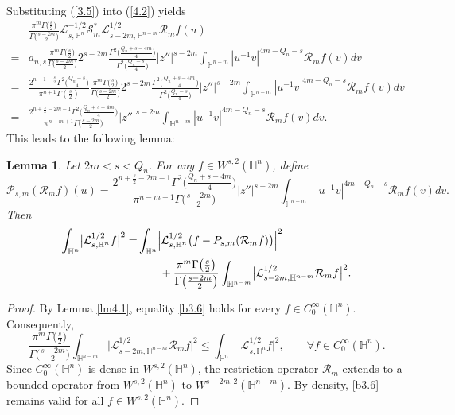 \documentclass[12pt,reqno]{amsart}%
\theoremstyle{plain}
\newtheorem{lemma}{Lemma}[section]
\numberwithin{equation}{section}
\begin{document}
Substituting (\ref{3.5}) into (\ref{4.2}) yields
\begin{align}\nonumber
&\frac{\pi^{m}\Gamma\bigl(\frac{s}{2}\bigr)}{\Gamma\bigl(\frac{s-2m}{2}\bigr)}
\mathcal{L}_{s,\mathbb{H}^{n}}^{-1/2}\mathcal{S}_{m}^{\ast}
\mathcal{L}_{s-2m,\mathbb{H}^{n-m}}^{1/2}\mathcal{R}_{m}f(u)\\
\nonumber
=& a_{n,s}\frac{\pi^{m}\Gamma\bigl(\frac{s}{2}\bigr)}{\Gamma\bigl(\frac{s-2m}{2}\bigr)}
2^{s-2m}\frac{\Gamma^{2}\bigl(\frac{Q_{n}+s-4m}{4}\bigr)}
{\Gamma^{2}\bigl(\frac{Q_{n}-s}{4}\bigr)}
|z''|^{s-2m}\int_{\mathbb{H}^{n-m}} |u^{-1}v|^{4m-Q_n-s}\mathcal{R}_{m}f(v)dv\\
\nonumber
=& \frac{2^{n-1-\frac{s}{2}}\Gamma^{2}\bigl(\frac{Q_n-s}{4}\bigr)}
{\pi^{n+1}\Gamma(\frac{s}{2})}
\frac{\pi^{m}\Gamma\bigl(\frac{s}{2}\bigr)}{\Gamma\bigl(\frac{s-2m}{2}\bigr)}
2^{s-2m}\frac{\Gamma^{2}\bigl(\frac{Q_{n}+s-4m}{4}\bigr)}
{\Gamma^{2}\bigl(\frac{Q_{n}-s}{4}\bigr)}
|z''|^{s-2m}
\int_{\mathbb{H}^{n-m}} |u^{-1}v|^{4m-Q_n-s}\mathcal{R}_{m}f(v)dv\\
=& \frac{2^{n+\frac{s}{2}-2m-1}\Gamma^{2}\bigl(\frac{Q_n+s-4m}{4}\bigr)}
{\pi^{n-m+1}\Gamma\bigl(\frac{s-2m}{2}\bigr)}
|z''|^{s-2m}
\int_{\mathbb{H}^{n-m}} |u^{-1}v|^{4m-Q_n-s}\mathcal{R}_{m}f(v)dv.
\label{c3.7}
\end{align}
This leads to the following lemma:
\begin{lemma}\label{lm4.2}
Let \(2m < s < Q_n\). For any \(f \in W^{s,2}(\mathbb{H}^{n})\), define
\[
\mathcal{P}_{s,m}(\mathcal{R}_{m}f)(u)=\frac{2^{n+\frac{s}{2}-2m-1}\Gamma^{2}\bigl(\frac{Q_n+s-4m}{4}\bigr)}
{\pi^{n-m+1}\Gamma\bigl(\frac{s-2m}{2}\bigr)}
|z''|^{s-2m}\int_{\mathbb{H}^{n-m}} |u^{-1}v|^{4m-Q_n-s}\mathcal{R}_{m}f(v)dv .
\]
Then
\begin{align}\nonumber
\int_{\mathbb{H}^{n}}\bigl|\mathcal{L}_{s,\mathbb{H}^{n}}^{1/2}f\bigr|^{2}
=& \int_{\mathbb{H}^{n}}\Bigl|\mathcal{L}_{s,\mathbb{H}^{n}}^{1/2}\bigl(f-
P_{s,m}(\mathcal{R}_{m}f)\bigr)\Bigr|^{2} \\
\label{b3.6}
&\qquad+ \frac{\pi^{m}\Gamma\bigl(\frac{s}{2}\bigr)}{\Gamma\bigl(\frac{s-2m}{2}\bigr)}
\int_{\mathbb{H}^{n-m}}\bigl|\mathcal{L}_{s-2m,\mathbb{H}^{n-m}}^{1/2}\mathcal{R}_{m}f\bigr|^{2}.
\end{align}


\end{lemma}
\begin{proof}
By Lemma \ref{lm4.1}, equality \eqref{b3.6} holds for every \(f \in C_{0}^{\infty}(\mathbb{H}^{n})\). Consequently,
\[
\frac{\pi^{m}\Gamma\bigl(\frac{s}{2}\bigr)}{\Gamma\bigl(\frac{s-2m}{2}\bigr)}
\int_{\mathbb{H}^{n-m}}\bigl|\mathcal{L}_{s-2m,\mathbb{H}^{n-m}}^{1/2}\mathcal{R}_{m}f\bigr|^{2}
\leq \int_{\mathbb{H}^{n}}\bigl|\mathcal{L}_{s,\mathbb{H}^{n}}^{1/2}f\bigr|^{2},
\qquad \forall f \in C_{0}^{\infty}(\mathbb{H}^{n}).
\]
Since \(C_{0}^{\infty}(\mathbb{H}^{n})\) is dense in \(W^{s,2}(\mathbb{H}^{n})\), the restriction operator \(\mathcal{R}_{m}\) extends to a bounded operator from \(W^{s,2}(\mathbb{H}^{n})\) to \(W^{s-2m,2}(\mathbb{H}^{n-m})\). By density, \eqref{b3.6} remains valid for all \(f \in W^{s,2}(\mathbb{H}^{n})\).
\end{proof}
\end{document}
